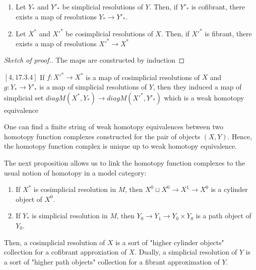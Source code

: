 \begin{lemma}
\begin{enumerate}
\item Let $Y_*$ and $Y'_*$ be simplicial resolutions of $Y$. Then, if $Y'_*$ is cofibrant, there exists a map of resolutions $Y_* \rightarrow Y'_*$.
\item Let $X^*$ and $X'^*$ be cosimplicial resolutions of $X$. Then, if $X'^*$ is fibrant, there exists a map of resolutions $X'^* \rightarrow X^*$
\end{enumerate}
\end{lemma}

\begin{proof}[Sketch of proof.]
The maps are constructed by induction
\end{proof}

\begin{prop} $[4,17.3.4]$
If $f:{X'}^* \rightarrow X^*$ is a map of cosimplicial resolutions of $X$ and $g:Y_* \rightarrow {Y'}_*$ is a map of simplicial resolutions of $Y$, then they induced a map of simplicial set $diag M(X^*,Y_*) \rightarrow diag M({X'}^*,{Y'}_*)$ which is a weak homotopy equivalence
\end{prop}

\begin{cor}
One can find a finite string of weak homotopy equivalences between two homotopy function complexes constructed for the pair of objects $(X,Y)$. Hence, the homotopy function complex is unique up to weak homotopy equivalence.
\end{cor}

The next proposition allows us to link the homotopy function complexes to the usual notion of homotopy in a model category:

\begin{prop}
\begin{enumerate}
\item If $X^*$ is cosimplicial resolution in $M$, then $X^0 \sqcup X^0 \rightarrow X^1 \rightarrow X^0$ is a cylinder object of $X^0$.
\item If $Y_*$ is simplicial resolution in $M$, then $Y_0 \rightarrow Y_1 \rightarrow Y_0 \times Y_0$ is a path object of $Y_0$.
\end{enumerate}
\end{prop}

Then, a cosimplicial resolution of $X$ is a sort of "higher cylinder objects" collection for a cofibrant approxiation of $X$. Dually, a simplicial resolution of $Y$ is a sort of "higher path objects" collection for a fibrant approximation of $Y$.



